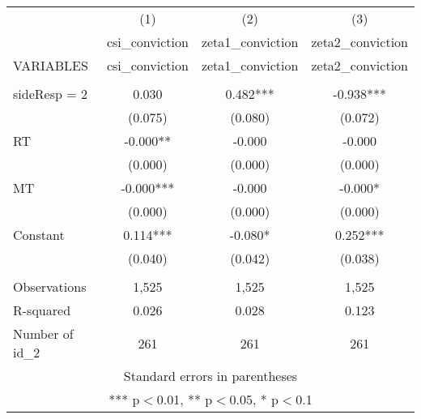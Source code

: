 \documentclass[]{article}
\begin{document}
\begin{tabular}{lccc} \hline
 & (1) & (2) & (3) \\
 & csi\_conviction & zeta1\_conviction & zeta2\_conviction \\
VARIABLES & csi\_conviction & zeta1\_conviction & zeta2\_conviction \\ \hline
 &  &  &  \\
sideResp = 2 & 0.030 & 0.482*** & -0.938*** \\
 & (0.075) & (0.080) & (0.072) \\
RT & -0.000** & -0.000 & -0.000 \\
 & (0.000) & (0.000) & (0.000) \\
MT & -0.000*** & -0.000 & -0.000* \\
 & (0.000) & (0.000) & (0.000) \\
Constant & 0.114*** & -0.080* & 0.252*** \\
 & (0.040) & (0.042) & (0.038) \\
 &  &  &  \\
Observations & 1,525 & 1,525 & 1,525 \\
R-squared & 0.026 & 0.028 & 0.123 \\
 Number of id\_2 & 261 & 261 & 261 \\ \hline
\multicolumn{4}{c}{ Standard errors in parentheses} \\
\multicolumn{4}{c}{ *** p$<$0.01, ** p$<$0.05, * p$<$0.1} \\
\end{tabular}
\end{document}
